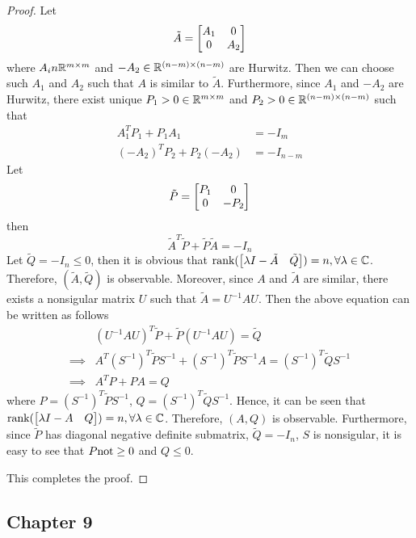\begin{proof}
Let 
\begin{equation}
    \tilde{A} = \begin{bmatrix} A_1 &0 \\ 0 &A_2 \end{bmatrix}
\end{equation}
where $A_in\mathbb{R}^{m\times m}$ and $-A_2\in\mathbb{R}^{(n-m)\times(n-m)}$ are Hurwitz. Then we can choose such $A_1$ and $A_2$ such that $A$ is similar to $\tilde{A}$. Furthermore, since $A_1$ and $-A_2$ are Hurwitz, there exist unique $P_1>0\in\mathbb{R}^{m\times m}$ and $P_2>0\in\mathbb{R}^{(n-m)\times(n-m)}$ such that 
\begin{align}
    A_1^TP_1 + P_1A_1 &= -I_m \\
    (-A_2)^TP_2 + P_2(-A_2) &= -I_{n-m}
\end{align}
Let 
\begin{equation}
    \tilde P = \begin{bmatrix} P_1 &0 \\ 0 &-P_2 \end{bmatrix}
\end{equation}
then
\begin{equation}
    \tilde{A}^T\tilde P + \tilde P\tilde{A} = -I_n
\end{equation}
Let $\tilde Q = -I_n \leq 0$, then it is obvious that $\textnormal{rank}(\begin{bmatrix} \lambda I - \tilde{A} &\tilde Q \end{bmatrix}) = n, \forall \lambda\in\mathbb{C}$. Therefore, $(\tilde{A},\tilde Q)$ is observable. Moreover, since $A$ and $\tilde{A}$ are similar, there exists a nonsigular matrix $U$ such that $\tilde{A} = U^{-1}AU$. Then the above equation can be written as follows
\begin{equation}
    \begin{aligned}
        &(U^{-1}AU)^T\tilde P + \tilde P(U^{-1}AU) = \tilde Q \\
        \implies &A^T(S^{-1})^T\tilde PS^{-1} + (S^{-1})^T\tilde PS^{-1}A = (S^{-1})^T\tilde QS^{-1}\\
        \implies &A^TP + PA = Q
    \end{aligned}
\end{equation}
where $P = (S^{-1})^T\tilde P S^{-1}$, $Q = (S^{-1})^T\tilde Q S^{-1}$. Hence, it can be seen that $\textnormal{rank}(\begin{bmatrix} \lambda I - {A} & Q \end{bmatrix}) = n, \forall \lambda\in\mathbb{C}$. Therefore, $({A}, Q)$ is observable. Furthermore, since $\tilde{P}$ has diagonal negative definite submatrix, $\tilde{Q} = -I_n$, $S$ is nonsigular, it is easy to see that $P \textnormal{not} \geq 0$ and $Q\leq 0$.

This completes the proof.

\end{proof}


\subsection{Chapter 9}
